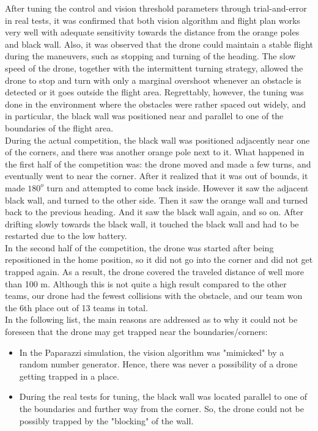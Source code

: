 After tuning the control and vision threshold parameters through trial-and-error in real tests, it was confirmed that both vision algorithm and flight plan works very well with adequate sensitivity towards the distance from the orange poles and black wall. Also, it was observed that the drone could maintain a stable flight during the maneuvers, such as stopping and turning of the heading. The slow speed of the drone, together with the intermittent turning strategy, allowed the drone to stop and turn with only a marginal overshoot whenever an obstacle is detected or it goes outside the flight area. Regrettably, however, the tuning was done in the environment where the obstacles were rather spaced out widely, and in particular, the black wall was positioned near and parallel to one of the boundaries of the flight area.\\

During the actual competition, the black wall was positioned adjacently near one of the corners, and there was another orange pole next to it. What happened in the first half of the competition was: the drone moved and made a few turns, and eventually went to near the corner. After it realized that it was out of bounds, it made $180^o$ turn and attempted to come back inside. However it saw the adjacent black wall, and turned to the other side. Then it saw the orange wall and turned back to the previous heading. And it saw the black wall again, and so on. After drifting slowly towards the black wall, it touched the black wall and had to be restarted due to the low battery.\\

In the second half of the competition, the drone was started after being repositioned in the home position, so it did not go into the corner and did not get trapped again. As a result, the drone covered the traveled distance of well more than 100 m. Although this is not quite a high result compared to the other teams, our drone had the fewest collisions with the obstacle, and our team won the 6th place out of 13 teams in total.\\

In the following list, the main reasons are addressed as to why it could not be foreseen that the drone may get trapped near the boundaries/corners:
\begin{itemize}
	\item In the Paparazzi simulation, the vision algorithm was "mimicked" by a random number generator. Hence, there was never a possibility of a drone getting trapped in a place.
	\item During the real tests for tuning, the black wall was located parallel to one of the boundaries and further way from the corner. So, the drone could not be possibly trapped by the "blocking" of the wall.
\end{itemize}

